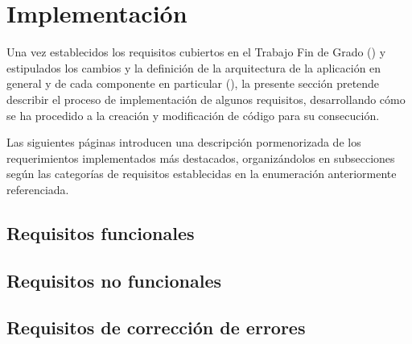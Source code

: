 \section{Implementación}
\label{sec:implementacion}

Una vez establecidos los requisitos cubiertos en el Trabajo Fin de Grado () y estipulados los cambios y la definición de la arquitectura de la aplicación en general y de cada componente en particular (), la presente sección pretende describir el proceso de implementación de algunos requisitos, desarrollando cómo se ha procedido a la creación y modificación de código para su consecución.

Las siguientes páginas introducen una descripción pormenorizada de los requerimientos implementados más destacados, organizándolos en subsecciones según las categorías de requisitos establecidas en la enumeración anteriormente referenciada.

\subsection{Requisitos funcionales}
\label{subsec:reqsFuncionales}













\subsection{Requisitos no funcionales}
\label{subsec:reqsNoFuncionales}





\subsection{Requisitos de corrección de errores}
\label{subsec:reqsErrores}

